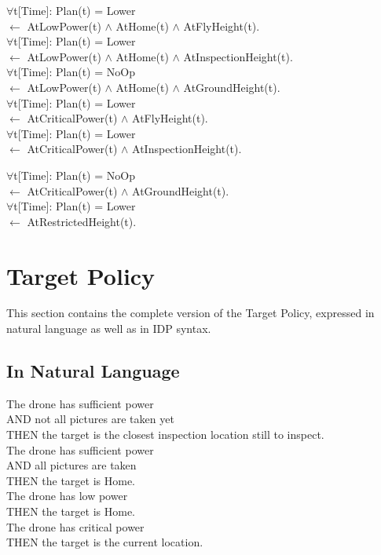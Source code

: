 \documentclass{article}
\begin{document}
\begin{landscape}
$\forall$t[Time]: Plan(t) = Lower				\\ \indent$\leftarrow$ AtLowPower(t) $\wedge$  AtHome(t) $\wedge$ AtFlyHeight(t).\vspace{2mm}\\
$\forall$t[Time]: Plan(t) = Lower				\\ \indent$\leftarrow$ AtLowPower(t) $\wedge$  AtHome(t) $\wedge$ AtInspectionHeight(t).\vspace{2mm}\\
$\forall$t[Time]: Plan(t) = NoOp				\\ \indent$\leftarrow$ AtLowPower(t) $\wedge$  AtHome(t) $\wedge$ AtGroundHeight(t).\vspace{2mm}\\
$\forall$t[Time]: Plan(t) = Lower				\\ \indent$\leftarrow$ AtCriticalPower(t) $\wedge$ AtFlyHeight(t).\vspace{2mm}\\
$\forall$t[Time]: Plan(t) = Lower				\\ \indent$\leftarrow$ AtCriticalPower(t) $\wedge$ AtInspectionHeight(t).
\end{landscape}
\noindent
$\forall$t[Time]: Plan(t) = NoOp				\\ \indent$\leftarrow$ AtCriticalPower(t) $\wedge$ AtGroundHeight(t).\vspace{2mm}\\
$\forall$t[Time]: Plan(t) = Lower				\\ \indent$\leftarrow$ AtRestrictedHeight(t).

\newpage

\section{Target Policy}
\label{app:tpolicy}
This section contains the complete version of the Target Policy, expressed in natural language as well as in IDP syntax.
\subsection{In Natural Language}
The drone has sufficient power\\
\indent AND not all pictures are taken yet\\
\indent THEN the target is the closest inspection location still to inspect.
\newline\\
The drone has sufficient power\\
\indent AND all pictures are taken\\
\indent THEN the target is Home.
\newline\\
The drone has low power\\
\indent THEN the target is Home.
\newline\\
The drone has critical power\\
\indent THEN the target is the current location.
\end{document}
